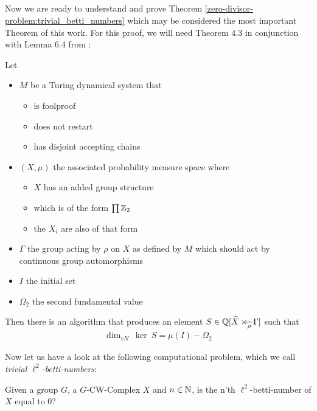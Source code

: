\subsection{}

Now we are ready to understand and prove Theorem \ref{zero-divisor-problem:trivial_betti_numbers} which may be considered the most important Theorem of this work.
For this proof, we will need Theorem 4.3 in conjunction with Lemma 6.4 from \cite{gra14}:

\begin{Theorem}
	\label{the_zero_divisor_problem:grabowskis_theorem}
	Let
	\begin{itemize}
		\item{
			$M$ be a Turing dynamical system that
			\begin{itemize}
				\item{is foolproof}
				\item{does not restart}
				\item{has disjoint accepting chains}
			\end{itemize}
		}
		\item{
			$(X, \mu)$ the associated probability measure space where
			\begin{itemize}
				\item{$X$ has an added group structure}
				\item{which is of the form $\prod \mathbb{Z}_2$}
				\item{the $X_i$ are also of that form}
			\end{itemize}
		}
		\item{$\Gamma$ the group acting by $\rho$ on $X$ as defined by $M$ which should act by continuous group automorphisms}
		\item{$I$ the initial set}
		\item{$\Omega_2$ the second fundamental value}
	\end{itemize}

	Then there is an algorithm that produces an element $S \in \mathbb{Q}[\widehat{X} \rtimes_{\widehat{\rho}} \Gamma]$ such that
	\begin{align*}
		\dim_{vN} ~ \ker ~ S = \mu(I) - \Omega_2
	\end{align*}
\end{Theorem}

Now let us have a look at the following computational problem, which we call \emph{trivial $\ell^2$-betti-numbers}:

Given a group $G$, a $G$-CW-Complex $X$ and $n \in \mathbb{N}$, is the n'th $\ell^2$-betti-number of $X$ equal to 0?

